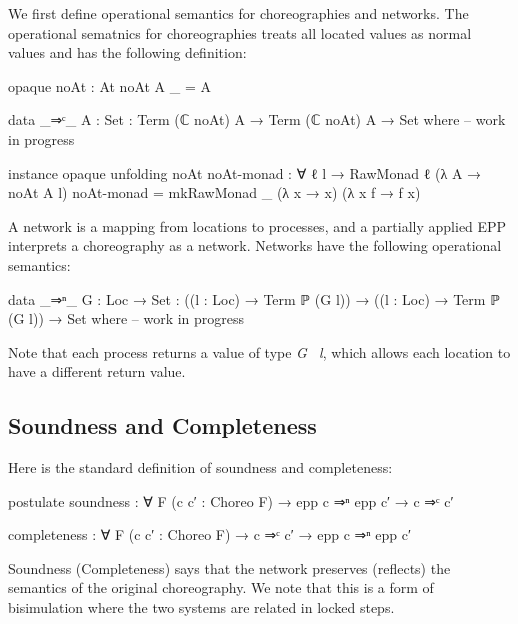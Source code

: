 We first define operational semantics for choreographies and networks.
%
The operational sematnics for choreographies treats all located values as normal values and has the following definition:
%
\begin{center}\begin{code}
opaque
  noAt : At
  noAt A _ = A

data _⇒ᶜ_ {A : Set} : Term (ℂ noAt) A → Term (ℂ noAt) A → Set where
-- work in progress
\end{code}\end{center}
\begin{code}[hide]
instance
  opaque
    unfolding noAt
    noAt-monad : ∀ {ℓ} {l} → RawMonad {ℓ} (λ A → noAt A l)
    noAt-monad = mkRawMonad _ (λ x → x) (λ x f → f x)
\end{code}
%
A network is a mapping from locations to processes, and a partially applied EPP interprets a choreography as a network.
%
Networks have the following operational semantics:
%
\begin{center}\begin{code}
data _⇒ⁿ_ {G : Loc → Set} :
  ((l : Loc) → Term ℙ (G l)) → ((l : Loc) → Term ℙ (G l)) → Set where
-- work in progress
\end{code}\end{center}
%
Note that each process returns a value of type \textit{G \ l}, which allows each location to have a different return value.

\subsection{Soundness and Completeness}

Here is the standard definition of soundness and completeness:
%
\begin{center}\begin{code}
postulate
  soundness : ∀ {F} (c c′ : Choreo F) →
    epp c ⇒ⁿ epp c′ → c ⇒ᶜ c′

  completeness : ∀ {F} (c c′ : Choreo F) →
    c ⇒ᶜ c′ → epp c ⇒ⁿ epp c′
\end{code}\end{center}
%
Soundness (Completeness) says that the network preserves (reflects) the semantics of the original choreography.
%
We note that this is a form of bisimulation where the two systems are related in locked steps.
